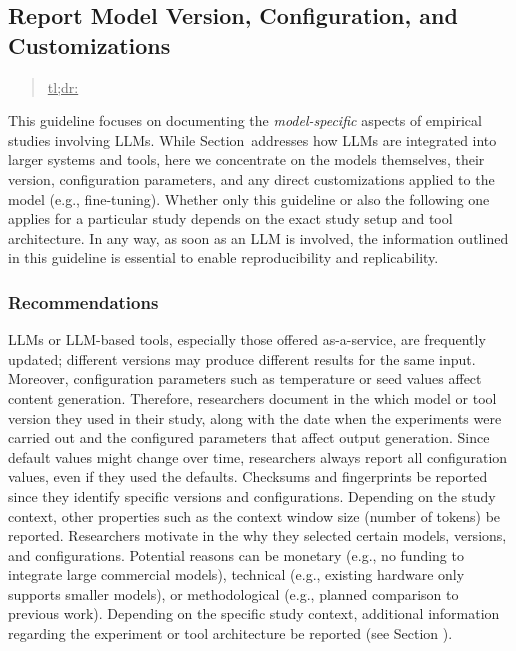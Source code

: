 



\subsection{Report Model Version, Configuration, and Customizations}
\label{sec:report-model-version-configuration-and-customizations}

\begin{quote}
\underline{tl;dr:} 
\end{quote}

This guideline focuses on documenting the \emph{model-specific} aspects of empirical studies involving LLMs.
While Section~\toolarchitecture addresses how LLMs are integrated into larger systems and tools, here we concentrate on the models themselves, their version, configuration parameters, and any direct customizations applied to the model (e.g., fine-tuning).
Whether only this guideline or also the following one applies for a particular study depends on the exact study setup and tool architecture.
In any way, as soon as an LLM is involved, the information outlined in this guideline is essential to enable reproducibility and replicability.

\subsubsection{Recommendations}

LLMs or LLM-based tools, especially those offered as-a-service, are frequently updated; different versions may produce different results for the same input.
Moreover, configuration parameters such as temperature or seed values affect content generation.
Therefore, researchers \must document in the \paper which model or tool version they used in their study, along with the date when the experiments were carried out and the configured parameters that affect output generation.
Since default values might change over time, researchers \should always report all configuration values, even if they used the defaults.
Checksums and fingerprints \may be reported since they identify specific versions and configurations.
Depending on the study context, other properties such as the context window size (number of tokens) \may be reported.
Researchers \should motivate in the \paper why they selected certain models, versions, and configurations.
Potential reasons can be monetary (e.g., no funding to integrate large commercial models), technical (e.g., existing hardware only supports smaller models), or methodological (e.g., planned comparison to previous work).
Depending on the specific study context, additional information regarding the experiment or tool architecture \should be reported (see Section \toolarchitecture).

